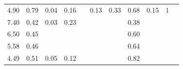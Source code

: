 \begin{refsection}[referencesCh3]
\begin{table}
\begin{adjustbox}{scale=0.8,center}
\begin{tabular}{@{}ccccccccccc@{}}
		4.90                                                         & 0.79                                                & 0.04                                                & 0.16                                                &                                                     & 0.13                                                 & 0.33                                                & 0.68                                                  & 0.15                                                    & 1                                                    & \cite{WRAP}                                                                              \\
		7.40                                                         & 0.42                                                & 0.03                                                & 0.23                                                &                                                     &                                                      &                                                     & 0.38                                                  &                                                         &                                                      & \cite{ADAS}            \\
		6.50                                                         & 0.45                                                &                                                     &                                                     &                                                     &                                                      &                                                     & 0.60                                                  &                                                         &                                                      & \cite{ADAS}            \\
		5.58                                                         & 0.46                                                &                                                     &                                                     &                                                     &                                                      &                                                     & 0.64                                                  &                                                         &                                                      & \cite{ADAS}            \\
		4.49                                                         & 0.51                                                & 0.05                                                & 0.12                                                &                                                     &                                                      &                                                     & 0.82                                                  &                                                         &                                                      & \cite{ADAS}            \\

\end{tabular}
\end{adjustbox}
\end{table}
\end{refsection}
